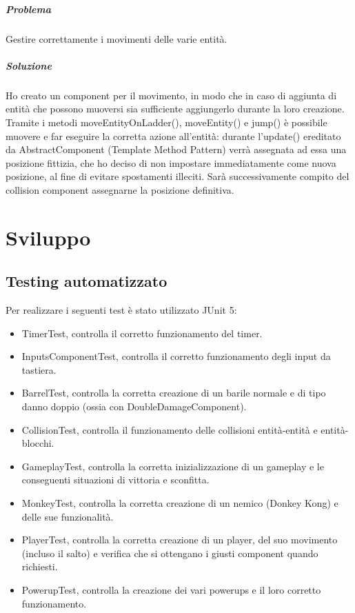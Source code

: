 \documentclass[a4paper,12pt]{report}
\begin{document}
\paragraph{Problema} Gestire correttamente i movimenti delle varie entità.

\paragraph{Soluzione} Ho creato un component per il movimento, in modo che in caso di aggiunta di entità che possono muoversi sia sufficiente aggiungerlo durante la loro creazione. Tramite i metodi moveEntityOnLadder(), moveEntity() e jump() è possibile muovere e far eseguire la corretta azione all’entità: durante l'update() ereditato da AbstractComponent (Template Method Pattern) verrà assegnata ad essa una posizione fittizia, che ho deciso di non impostare immediatamente come nuova posizione, al fine di evitare spostamenti illeciti. Sarà successivamente compito del collision component assegnarne la posizione definitiva.


\chapter{Sviluppo}
\section{Testing automatizzato}

Per realizzare i seguenti test è stato utilizzato JUnit 5:
\begin{itemize}
 \item TimerTest, controlla il corretto funzionamento del timer.
 \item InputsComponentTest, controlla il corretto funzionamento degli input da tastiera.
 \item BarrelTest, controlla la corretta creazione di un barile normale e di tipo danno doppio (ossia con DoubleDamageComponent).
 \item CollisionTest, controlla il funzionamento delle collisioni entità-entità e entità-blocchi.
 \item GameplayTest, controlla la corretta inizializzazione di un gameplay e le conseguenti situazioni di vittoria e sconfitta.
 \item MonkeyTest, controlla la corretta creazione di un nemico (Donkey Kong) e delle sue funzionalità.
 \item PlayerTest, controlla la corretta creazione di un player, del suo movimento (incluso il salto) e verifica che si ottengano i giusti component quando richiesti.
 \item PowerupTest, controlla la creazione dei vari powerups e il loro corretto funzionamento.
\end{itemize}
\end{document}
